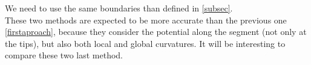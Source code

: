 \documentclass[11pt,a4paper]{article}
\begin{document}
We need to use the same boundaries than defined in \ref{subsec}.\\




These two methods are expected to be more accurate than the previous one \ref{firstaproach}, because they consider the potential along the segment (not only at the tips), but also both local and global curvatures.
It will be interesting to compare these two last method.




	
\end{document}
